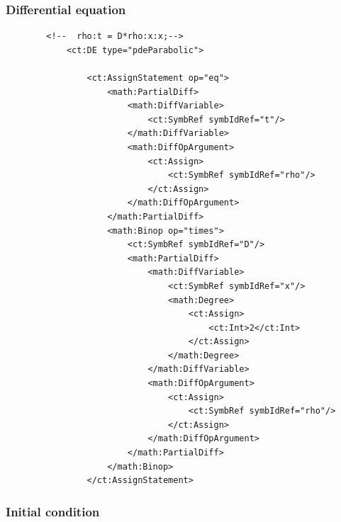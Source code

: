 \subsubsection*{Differential equation}

\lstset{language=XML}
\begin{lstlisting}
	    <!--  rho:t = D*rho:x:x;-->
            <ct:DE type="pdeParabolic">
                
                <ct:AssignStatement op="eq">
                    <math:PartialDiff>
                        <math:DiffVariable>
                            <ct:SymbRef symbIdRef="t"/>
                        </math:DiffVariable>
                        <math:DiffOpArgument>
                            <ct:Assign>
                                <ct:SymbRef symbIdRef="rho"/>
                            </ct:Assign>
                        </math:DiffOpArgument>
                    </math:PartialDiff>
                    <math:Binop op="times">
                        <ct:SymbRef symbIdRef="D"/>
                        <math:PartialDiff>
                            <math:DiffVariable>
                                <ct:SymbRef symbIdRef="x"/>
                                <math:Degree>
                                    <ct:Assign>
                                        <ct:Int>2</ct:Int>
                                    </ct:Assign>
                                </math:Degree>
                            </math:DiffVariable>
                            <math:DiffOpArgument>
                                <ct:Assign>
                                    <ct:SymbRef symbIdRef="rho"/>
                                </ct:Assign>
                            </math:DiffOpArgument>
                        </math:PartialDiff>
                    </math:Binop>
                </ct:AssignStatement>
\end{lstlisting}

\subsubsection*{Initial condition}

